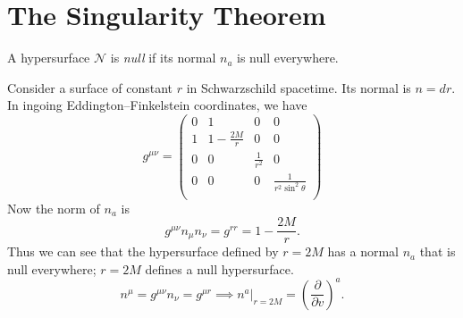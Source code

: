 \chapter{The Singularity Theorem}%
\label{cha:the_singularity_theorem}

\begin{definition}
  A hypersurface $\mathcal{N}$ is \emph{null} if its normal $n_a$ is null everywhere.
\end{definition}
\begin{example}[]
  Consider a surface of constant $r$  in Schwarzschild spacetime. Its normal is $n = dr$.
  In ingoing Eddington--Finkelstein coordinates, we have
   \begin{equation}
    g^{\mu\nu} = 
    \begin{pmatrix}
     0 & 1 & 0 & 0 \\
     1 & 1- \frac{2M}{r} & 0 & 0 \\
     0 & 0 & \frac{1}{r^2} & 0 \\
     0 & 0 & 0 & \frac{1}{r^2 \sin^2 \theta} \\
    \end{pmatrix}
  \end{equation}
  Now the norm of $n_a$  is 
  \begin{equation}
    g^{\mu\nu} n_{\mu} n_{\nu} = g^{rr} = 1 - \frac{2M}{r}.
  \end{equation}
  Thus we can see that the hypersurface defined by $r = 2M$ has  a normal $n_a$  that is null everywhere; $r = 2M$  defines a null hypersurface.
  \begin{equation}
    n^{\mu} = g^{\mu\nu} n_{\nu} = g^{\mu r} \implies n^a \rvert_{r = 2M} = \left( \frac{\partial }{\partial v} \right)^a.
  \end{equation}
\end{example}

